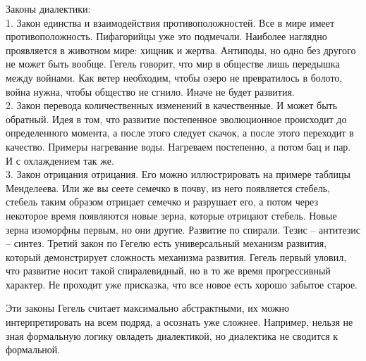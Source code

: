 \documentclass[a4paper, 12pt]{article}
\def\t{\hspace*{1cm}}
\begin{document}
Законы диалектики: 
\\\t 1. Закон единства и взаимодействия противоположностей. Все в мире имеет противоположность. Пифагорийцы уже это подмечали. Наиболее наглядно проявляется в животном мире: хищник и жертва. Антиподы, но одно без другого не может быть вообще. Гегель говорит, что мир в обществе лишь передышка между войнами. Как ветер необходим, чтобы озеро не превратилось в болото, война нужна, чтобы общество не сгнило. Иначе не будет развития. 
\\\t 2. Закон перевода количественных изменений в качественные. И может быть обратный. Идея в том, что развитие постепенное эволюционное происходит до определенного момента, а после этого следует скачок, а после этого переходит в качество. Примеры нагревание воды. Нагреваем постепенно, а потом бац и пар. И с охлаждением так же. 
\\\t 3. Закон отрицания отрицания. Его можно иллюстрировать на примере таблицы Менделеева. Или же вы сеете семечко в почву, из него появляется стебель, стебель таким образом отрицает семечко и разрушает его, а потом через некоторое время появляются новые зерна, которые отрицают стебель. Новые зерна изоморфны первым, но они другие. Развитие по спирали. Тезис -- антитезис -- синтез. Третий закон по Гегелю есть универсальный механизм развития, который демонстрирует сложность механизма развития. Гегель первый уловил, что развитие носит такой спиралевидный, но в то же время прогрессивный характер. Не проходит уже присказка, что все новое есть хорошо забытое старое. 

Эти законы Гегель считает максимально абстрактными, их можно интерпретировать на всем подряд, а осознать уже сложнее. Например, нельзя не зная формальную логику овладеть диалектикой, но диалектика не сводится к формальной. 
\end{document}

